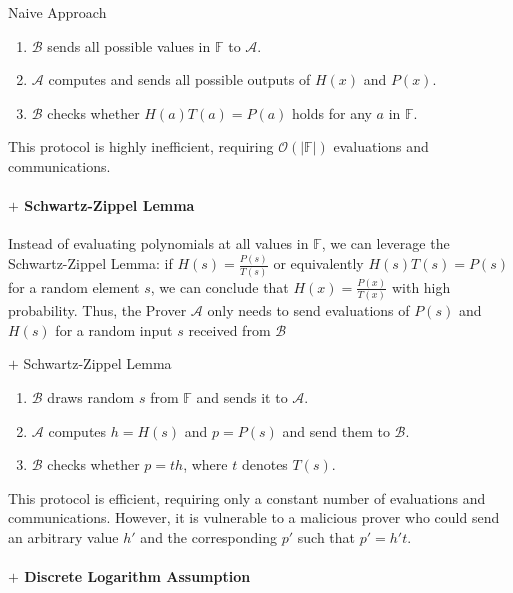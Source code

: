\documentclass{article}
\begin{document}
\begin{protocol}{Naive Approach}{}
\begin{enumerate}
    \item $\mathcal{B}$ sends all possible values in $\mathbb{F}$ to $\mathcal{A}$.
    \item $\mathcal{A}$ computes and sends all possible outputs of $H(x)$ and $P(x)$.
    \item $\mathcal{B}$ checks whether $H(a)T(a) = P(a)$ holds for any $a$ in $\mathbb{F}$.
\end{enumerate}
\end{protocol}

This protocol is highly inefficient, requiring $\mathcal{O}(|\mathbb{F}|)$ evaluations and communications.

\paragraph{$+$ Schwartz-Zippel Lemma}

Instead of evaluating polynomials at all values in $\mathbb{F}$, we can leverage the Schwartz-Zippel Lemma: if $H(s) = \frac{P(s)}{T(s)}$ or equivalently $H(s)T(s) = P(s)$ for a random element $s$, we can conclude that $H(x) = \frac{P(x)}{T(x)}$ with high probability. Thus, the Prover $\mathcal{A}$ only needs to send evaluations of $P(s)$ and $H(s)$ for a random input $s$ received from $\mathcal{B}$

\begin{protocol}{$+$ Schwartz-Zippel Lemma}{}
    \begin{enumerate}
    \item $\mathcal{B}$ draws random $s$ from $\mathbb{F}$ and sends it to $\mathcal{A}$.
    \item $\mathcal{A}$ computes $h = H(s)$ and $p = P(s)$ and send them to $\mathcal{B}$.
    \item $\mathcal{B}$ checks whether $p = t h$, where $t$ denotes $T(s)$.
\end{enumerate}
\end{protocol}

This protocol is efficient, requiring only a constant number of evaluations and communications. However, it is vulnerable to a malicious prover who could send an arbitrary value $h'$ and the corresponding $p'$ such that $p' = h't$.

\paragraph{$+$ Discrete Logarithm Assumption}
\end{document}
